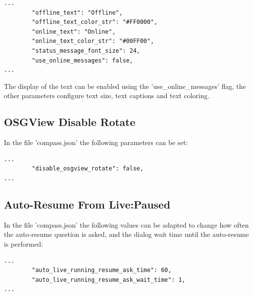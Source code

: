 \begin{lstlisting}
...
        "offline_text": "Offline",
        "offline_text_color_str": "#FF0000",
        "online_text": "Online",
        "online_text_color_str": "#00FF00",
        "status_message_font_size": 24,
        "use_online_messages": false,        
...        
\end{lstlisting}

The display of the text can be enabled using the 'use\_online\_messages' flag, the other parameters configure text size, text captions and text coloring.

\subsection{OSGView Disable Rotate}

In the file 'compass.json' the following parameters can be set:

\begin{lstlisting}
...
        "disable_osgview_rotate": false,
...        
\end{lstlisting}

\subsection{Auto-Resume From Live:Paused}
\label{sec:live_paused_resume}

In the file 'compass.json' the following values can be adapted to change how often the auto-resume question is asked, and the dialog wait time until the auto-resume is performed:

\begin{lstlisting}
...
        "auto_live_running_resume_ask_time": 60,
        "auto_live_running_resume_ask_wait_time": 1,
...        
\end{lstlisting}


